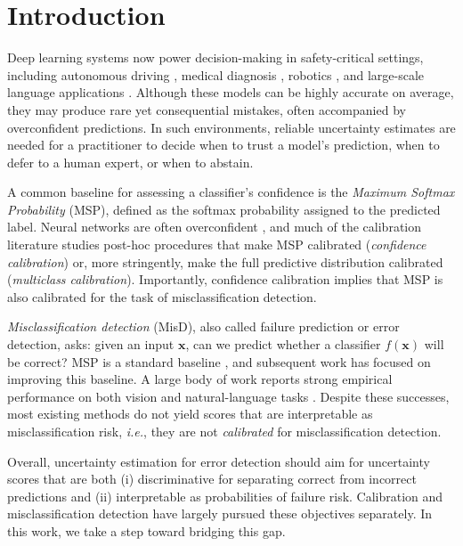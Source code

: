 \documentclass{article}
\theoremstyle{plain}
\theoremstyle{definition}
\theoremstyle{remark}
\begin{document}
\section{Introduction}
Deep learning systems now power decision-making in safety-critical settings, including autonomous driving \citep{hecker2018failurepredictionautonomousdriving}, medical diagnosis \citep{medicalexample}, robotics \citep{grislain2025ifailsensegeneralroboticfailure}, and large-scale language applications \citep{kumar2023conformalpredictionlargelanguage}.
Although these models can be highly accurate on average, they may produce rare yet consequential mistakes, often accompanied by overconfident predictions. In such environments, reliable uncertainty estimates are needed for a practitioner to decide when to trust a model’s prediction, when to defer to a human expert, or when to abstain.

A common baseline for assessing a classifier’s confidence is the \textit{Maximum Softmax Probability} (MSP), defined as the softmax probability assigned to the predicted label. Neural networks are often overconfident \citep{guo2017calibrationmodernneuralnetworks}, and much of the calibration literature studies post-hoc procedures that make MSP calibrated (\emph{confidence calibration}) or, more stringently, make the full predictive distribution calibrated (\emph{multiclass calibration}). Importantly, confidence calibration implies that MSP is also calibrated for the task of misclassification detection.

\emph{Misclassification detection} (MisD), also called failure prediction or error detection, asks: given an input $\mathbf{x}$, can we predict whether a classifier $f(\mathbf{x})$ will be correct? MSP is a standard baseline \citep{hendrycks2018baselinedetectingmisclassifiedoutofdistribution}, and subsequent work has focused on improving this baseline. A large body of work reports strong empirical performance on both vision and natural-language tasks
\citep{hendrycks2018baselinedetectingmisclassifiedoutofdistribution, jiang_trust, granese2021doctorsimplemethoddetecting, dadalto2024datadrivenmeasurerelativeuncertainty, gudovskiy2023flowenedet, moon2020confidenceawarelearningdeepneural, fisch2022calibrated, vazhentsev_uncertainty_2022, vashurin_benchmarking_2025}.
Despite these successes, most existing methods do not yield scores that are interpretable as misclassification risk, \textit{i.e.}, they are not \textit{calibrated} for misclassification detection.

Overall, uncertainty estimation for error detection should aim for uncertainty scores that are both (i) discriminative for separating correct from incorrect predictions and (ii) interpretable as probabilities of failure risk. Calibration and misclassification detection have largely pursued these objectives separately. In this work, we take a step toward bridging this gap.
\end{document}
